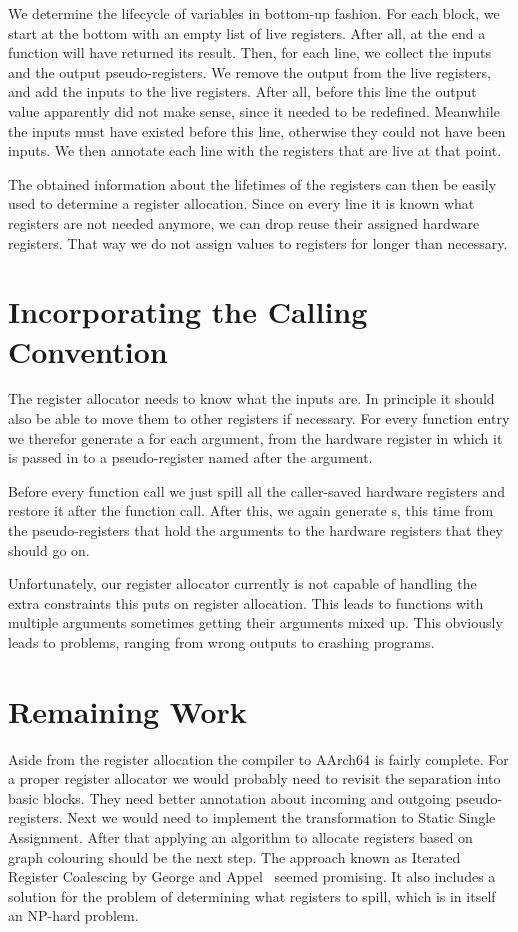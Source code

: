 We determine the lifecycle of variables in bottom-up fashion.
For each block, we start at the bottom with an empty list of live registers.
After all, at the end a function will have returned its result.
Then, for each line, we collect the inputs and the output pseudo-registers.
We remove the output from the live registers, and add the inputs to the live registers.
After all, before this line the output value apparently did not make sense, since it needed to be redefined.
Meanwhile the inputs must have existed before this line, otherwise they could not have been inputs.
We then annotate each line with the registers that are live at that point.

The obtained information about the lifetimes of the registers can then be easily used to determine a register allocation.
Since on every line it is known what registers are not needed anymore, we can drop reuse their assigned hardware registers.
That way we do not assign values to registers for longer than necessary.

\section{Incorporating the Calling Convention}

The register allocator needs to know what the inputs are.
In principle it should also be able to move them to other registers if necessary.
For every function entry we therefor generate a  for each argument, from the hardware register in which it is passed in to a pseudo-register named after the argument.

Before every function call we just spill all the caller-saved hardware registers and restore it after the function call.
After this, we again generate s, this time from the pseudo-registers that hold the arguments to the hardware registers that they should go on.

Unfortunately, our register allocator currently is not capable of handling the extra constraints this puts on register allocation.
This leads to functions with multiple arguments sometimes getting their arguments mixed up.
This obviously leads to problems, ranging from wrong outputs to crashing programs.

\section{Remaining Work}

Aside from the register allocation the compiler to AArch64 is fairly complete.
For a proper register allocator we would probably need to revisit the separation into basic blocks.
They need better annotation about incoming and outgoing pseudo-registers.
Next we would need to implement the transformation to Static Single Assignment.
After that applying an algorithm to allocate registers based on graph colouring should be the next step.
The approach known as Iterated Register Coalescing by George and Appel~\cite{IRC} seemed promising.
It also includes a solution for the problem of determining what registers to spill, which is in itself an NP-hard problem.

